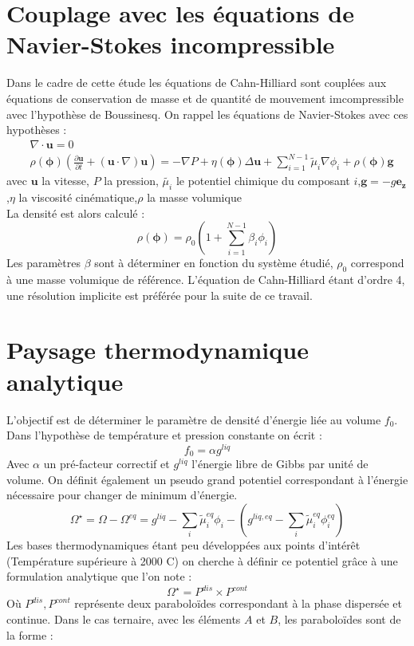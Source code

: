 \documentclass[a4paper,11pt,fleqn]{report}    %
\begin{document}
\section{Couplage avec les équations de Navier-Stokes incompressible}
Dans le cadre de cette étude les équations de Cahn-Hilliard sont couplées aux équations de conservation de masse et de quantité de mouvement imcompressible avec l'hypothèse de Boussinesq. On rappel les équations de Navier-Stokes avec ces hypothèses :
\begin{align}
&\nabla \cdot \mathbf{u} = 0\\
&\rho(\bm{\phi}) \left (\frac{\partial \mathbf{u}}{\partial t} + (\mathbf{u} \cdot {\nabla})\mathbf{u}\right) = -{\nabla} P +\eta(\bm{\phi}){\Delta} \mathbf{u}+\sum_{i=1}^{N-1} \tilde\mu_i{\nabla} \phi_i + \rho(\bm{\phi}) \mathbf{g}
\end{align}
avec $\mathbf{u}$ la vitesse, $P$ la pression, $\tilde{\mu_i}$ le potentiel chimique du composant $i$,$\mathbf{g} = -g \mathbf{e_z}$,$\eta$ la viscosité cinématique,$\rho$ la masse volumique\\
La densité est alors calculé : 
\begin{equation}
	\rho(\bm{\phi}) = \rho_0\left(1+\sum_{i=1}^{N-1}\beta_i \phi_i\right)
\end{equation}
Les paramètres $\beta$ sont à déterminer en fonction du système étudié, $\rho_0$ correspond à une masse volumique de référence. L'équation de Cahn-Hilliard étant d'ordre 4, une résolution implicite est préférée pour la suite de ce travail.
\section{Paysage thermodynamique analytique}
L'objectif est de déterminer le paramètre de densité d'énergie liée au volume $f_0$. Dans l'hypothèse de température et pression constante on écrit : 
\begin{equation}
	f_0 = \alpha g^{liq}
\end{equation}
Avec $\alpha$ un pré-facteur correctif et $g^{liq}$ l'énergie libre de Gibbs par unité de volume. On définit également un pseudo grand potentiel correspondant à l'énergie nécessaire pour changer de minimum d'énergie.
\begin{equation}
\Omega^{\star} =\Omega - \Omega^{eq} =  {g}^{liq} - \sum_i \tilde{\mu}_i^{eq}\phi_i - \left( {g}^{liq,eq} -  \sum_i \tilde{\mu}_i^{eq}\phi_i^{eq} \right) 
\end{equation}
Les bases thermodynamiques étant peu développées aux points d'intérêt (Température supérieure à 2000 \textdegree C) on cherche à définir ce potentiel grâce à une formulation analytique que l'on note :
\begin{equation}
	\Omega^{\star}  = P^{dis} \times P^{cont}
\end{equation}
Où $P^{dis}, P^{cont}$ représente deux paraboloïdes correspondant à la phase dispersée et continue. Dans le cas ternaire, avec les éléments $A$ et $B$, les paraboloïdes sont de la forme : 
\end{document}
